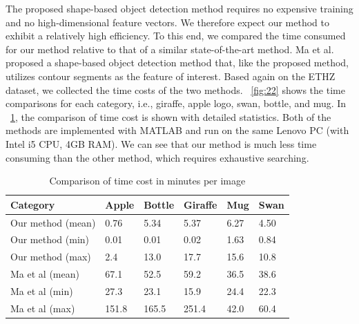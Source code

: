 \documentclass{article}
\begin{document}
The proposed shape-based object detection method requires no expensive training and no high-dimensional feature vectors. We therefore expect our method to exhibit a relatively high efficiency. 
To this end, we compared the time consumed for our method relative to that of a similar state-of-the-art method. 
Ma et al. \cite{ma2011} proposed a shape-based object detection method that, 
like the proposed method, utilizes contour segments as the feature of interest. 
Based again on the ETHZ dataset, we collected the time costs of the two methods.
\figurename~\ref{fig:22} shows the time comparisons for each category, 
i.e., giraffe, apple logo, swan, bottle, and mug. 
In \tablename~\ref{tab:2}, the comparison of time cost is shown with detailed statistics.
Both of the methods are implemented with MATLAB and run on the same Lenovo PC (with Intel i5 CPU, 4GB RAM).
We can see that our method is much less time consuming than the other method, 
which requires exhaustive searching.

\begin{table}[!t]
\renewcommand{\arraystretch}{1.3}
\caption{Comparison of time cost in minutes per image}
\label{tab:2}
\centering
\scriptsize
\begin{tabular}{l|lllll}
\hline
Category & Apple & Bottle & Giraffe & Mug & Swan \\
\hline
Our method (mean)& 0.76 & 5.34 & 5.37 & 6.27 & 4.50 \\
Our method (min)& 0.01 & 0.01 & 0.02 & 1.63 & 0.84 \\
Our method (max)& 2.4 & 13.0 & 17.7 & 15.6 & 10.8 \\
\hline
Ma et al (mean)& 67.1 & 52.5 & 59.2 & 36.5 & 38.6 \\
Ma et al (min)& 27.3 & 23.1 & 15.9 & 24.4 & 22.3 \\
Ma et al (max)& 151.8 & 165.5 & 251.4 & 42.0 & 60.4 \\
\hline
\end{tabular}
\end{table}
\end{document}
